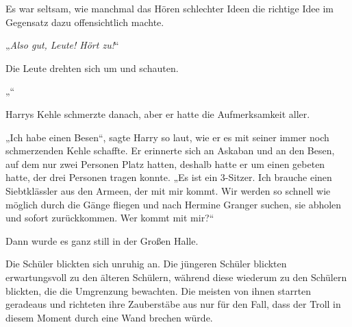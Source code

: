 Es war seltsam, wie manchmal das Hören schlechter Ideen die richtige Idee im Gegensatz dazu offensichtlich machte.

„\emph{Also gut, Leute! Hört zu!}“

Die Leute drehten sich um und schauten.

„“

Harrys Kehle schmerzte danach, aber er hatte die Aufmerksamkeit aller.

„Ich habe einen Besen“, sagte Harry so laut, wie er es mit seiner immer noch schmerzenden Kehle schaffte. Er erinnerte sich an Askaban und an den Besen, auf dem nur zwei Personen Platz hatten, deshalb hatte er um einen gebeten hatte, der drei Personen tragen konnte.
„Es ist ein 3-Sitzer. Ich brauche einen Siebtklässler aus den Armeen, der mit mir kommt. Wir werden so schnell wie möglich durch die Gänge fliegen und nach Hermine Granger suchen, sie abholen und sofort zurückkommen. Wer kommt mit mir?“

Dann wurde es ganz still in der Großen Halle.

\later

Die Schüler blickten sich unruhig an. Die jüngeren Schüler blickten erwartungsvoll zu den älteren Schülern, während diese wiederum zu den Schülern blickten, die die Umgrenzung bewachten. Die meisten von ihnen starrten geradeaus und richteten ihre Zauberstäbe aus nur für den Fall, dass der Troll in diesem Moment durch eine Wand brechen würde.

